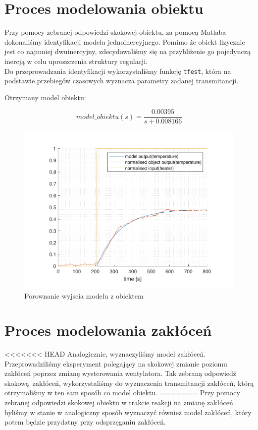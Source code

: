 \documentclass{mwrep}
\begin{document}
\section{Proces modelowania obiektu}
\label{ModelowanieObiektu}
Przy pomocy zebranej odpowiedzi skokowej obiektu, za pomocą Matlaba dokonaliśmy identyfikacji 
modelu jednoinercyjnego. Pomimo że obiekt fizycznie jest co najmniej dwuinercyjny, zdecydowaliśmy się na 
przybliżenie go pojedynczą inercją w celu uproszczenia struktury regulacji. \\
\indent Do przeprowadzania identyfikacji wykorzystaliśmy funkcję \texttt{tfest}, która na podstawie 
przebiegów czasowych wyznacza parametry zadanej transmitancji. 

Otrzymany model obiektu:

\[model\_obiektu(s) = \frac{0.00395}{s + 0.008166}\]

\begin{figure}[H]
\centering
\includegraphics[scale=0.8]{materialy/krystian_plots/wykresik_model_obiekt.pdf}
\caption{Porownanie wyjscia modelu z obiektem}
\end{figure}

\section{Proces modelowania zakłóceń}
\label{ModelowanieZaklocen}
<<<<<<< HEAD
Analogicznie, wyznaczyliśmy model zakłóceń. Przeprowadziliśmy eksperyment polegający na skokowej zmianie 
poziomu zakłóceń poprzez zmianę wysterowania wentylatora. Tak zebraną odpowiedź skokową zakłóceń, wykorzystaliśmy
do wyznaczenia transmitancji zakłóceń, którą otrzymaliśmy w ten sam sposób co model obiektu.
=======
Przy pomocy zebranej odpowiedzi skokowej obiektu w trakcie reakcji na zmianę zakłóceń byliśmy w stanie w analogiczny sposób wyznaczyć również model zakłóceń, który potem będzie przydatny przy odsprzęganiu zakłóceń.
\end{document}
